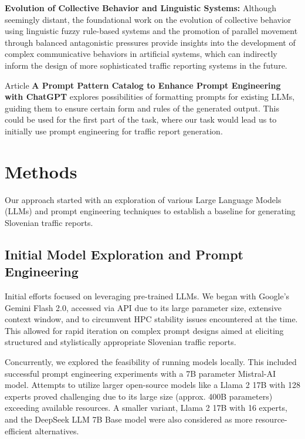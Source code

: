 \documentclass[fleqn,moreauthors,10pt]{ds_report}
\begin{document}
\textbf{Evolution of Collective Behavior and Linguistic Systems:} Although seemingly distant, the foundational work on the evolution of collective behavior using linguistic fuzzy rule-based systems \cite{Demsar2017LinguisticEvolution} and the promotion of parallel movement through balanced antagonistic pressures \cite{Demsar2016BalancedMixture} provide insights into the development of complex communicative behaviors in artificial systems, which can indirectly inform the design of more sophisticated traffic reporting systems in the future.
 
Article \textbf{A Prompt Pattern Catalog to Enhance Prompt Engineering with ChatGPT} explores possibilities of formatting prompts for existing LLMs, guiding them to ensure certain form and rules of the generated output. This could be used for the first part of the task, where our task would lead us to initially use prompt engineering for traffic report generation.

\section*{Methods}
Our approach started with an exploration of various Large Language Models (LLMs) and prompt engineering techniques to establish a baseline for generating Slovenian traffic reports.

\subsection*{Initial Model Exploration and Prompt Engineering}
Initial efforts focused on leveraging pre-trained LLMs. We began with Google's Gemini Flash 2.0, accessed via API due to its large parameter size, extensive context window, and to circumvent HPC stability issues encountered at the time. This allowed for rapid iteration on complex prompt designs aimed at eliciting structured and stylistically appropriate Slovenian traffic reports.

Concurrently, we explored the feasibility of running models locally. This included successful prompt engineering experiments with a 7B parameter Mistral-AI model. Attempts to utilize larger open-source models like a Llama 2 17B with 128 experts proved challenging due to its large size (approx. 400B parameters) exceeding available resources. A smaller variant, Llama 2 17B with 16 experts, and the DeepSeek LLM 7B Base model were also considered as more resource-efficient alternatives.
\end{document}
